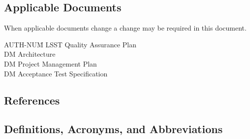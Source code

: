 \subsection{Applicable Documents \label{sect:ad}}

When applicable documents change a change may be required in this document.
\begin{tabbing}
AUTH-NUM\= \kill
{} \>	LSST Quality  Assurance Plan \\
 \>	DM Architecture\\
 \>	DM Project Management Plan   \\
 \>	DM Acceptance Test Specification \\
\end{tabbing}

\subsection{References}

\renewcommand{\refname}{}


\subsection{Definitions, Acronyms, and Abbreviations \label{sect:acronyms}}

